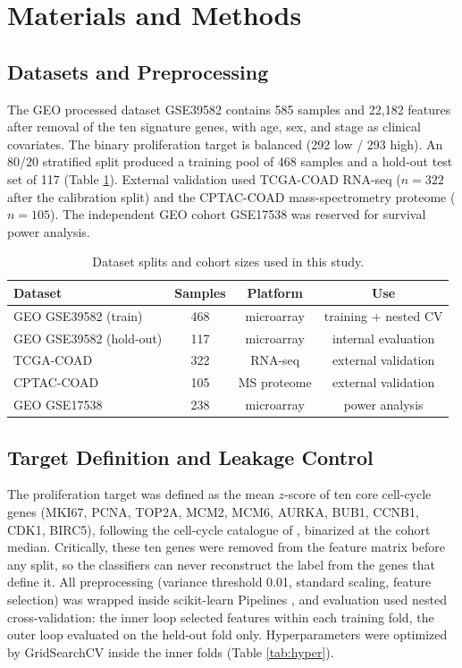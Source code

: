 \documentclass[12pt]{article}
\begin{document}
\section{Materials and Methods}

\subsection{Datasets and Preprocessing}
The GEO processed dataset GSE39582 \citep{marisa2013} contains 585 samples and 22,182 features after removal of the ten signature genes, with age, sex, and stage as clinical covariates. The binary proliferation target is balanced (292 low / 293 high). An 80/20 stratified split produced a training pool of 468 samples and a hold-out test set of 117 (Table \ref{tab:data}). External validation used TCGA-COAD RNA-seq \citep{tcga2012} ($n = 322$ after the calibration split) and the CPTAC-COAD mass-spectrometry proteome \citep{vasikar2019} ($n = 105$). The independent GEO cohort GSE17538 \citep{smith2010} was reserved for survival power analysis.

\begin{table}[htbp]
\centering
\caption{Dataset splits and cohort sizes used in this study.}
\label{tab:data}
\begin{tabular}{lccc}
\toprule
\textbf{Dataset} & \textbf{Samples} & \textbf{Platform} & \textbf{Use} \\
\midrule
GEO GSE39582 (train) & 468 & microarray & training + nested CV \\
GEO GSE39582 (hold-out) & 117 & microarray & internal evaluation \\
TCGA-COAD & 322 & RNA-seq & external validation \\
CPTAC-COAD & 105 & MS proteome & external validation \\
GEO GSE17538 & 238 & microarray & power analysis \\
\bottomrule
\end{tabular}
\end{table}

\subsection{Target Definition and Leakage Control}
The proliferation target was defined as the mean $z$-score of ten core cell-cycle genes (MKI67, PCNA, TOP2A, MCM2, MCM6, AURKA, BUB1, CCNB1, CDK1, BIRC5), following the cell-cycle catalogue of \citet{whitfield2002}, binarized at the cohort median. Critically, these ten genes were removed from the feature matrix before any split, so the classifiers can never reconstruct the label from the genes that define it. All preprocessing (variance threshold 0.01, standard scaling, feature selection) was wrapped inside scikit-learn Pipelines \citep{pedregosa2011}, and evaluation used nested cross-validation: the inner loop selected features within each training fold, the outer loop evaluated on the held-out fold only. Hyperparameters were optimized by GridSearchCV inside the inner folds (Table \ref{tab:hyper}).
\end{document}
